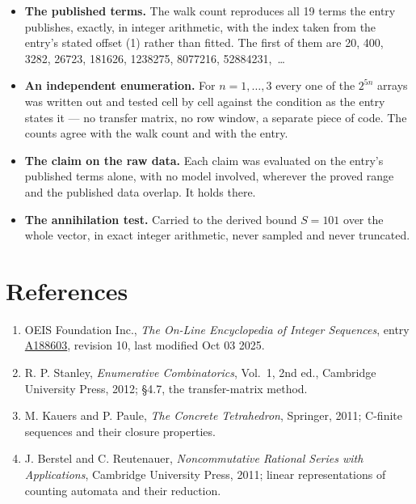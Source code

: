 \documentclass[11pt]{article}
\theoremstyle{definition}
\begin{document}
\begin{itemize}

\item {\bfseries The published terms.} The walk count reproduces all 19 terms the entry publishes, exactly, in integer arithmetic, with the index taken from the entry's stated offset (1) rather than fitted. The first of them are 20, 400, 3282, 26723, 181626, 1238275, 8077216, 52884231,~\dots

\item {\bfseries An independent enumeration.} For $n = 1,\dots,3$ every one of the $2^{5n}$ arrays was written out and tested cell by cell against the condition as the entry states it --- no transfer matrix, no row window, a separate piece of code. The counts agree with the walk count and with the entry.

\item {\bfseries The claim on the raw data.} Each claim was evaluated on the entry's published terms alone, with no model involved, wherever the proved range and the published data overlap. It holds there.

\item {\bfseries The annihilation test.} Carried to the derived bound $S = 101$ over the whole vector, in exact integer arithmetic, never sampled and never truncated.

\end{itemize}

\section{References}

\begin{enumerate}

\item OEIS Foundation Inc., \emph{The On-Line Encyclopedia of Integer Sequences}, entry \href{https://oeis.org/A188603}{A188603}, revision 10, last modified Oct 03 2025.

\item R. P. Stanley, \emph{Enumerative Combinatorics}, Vol.~1, 2nd ed., Cambridge University Press, 2012; \S4.7, the transfer-matrix method.

\item M. Kauers and P. Paule, \emph{The Concrete Tetrahedron}, Springer, 2011; C-finite sequences and their closure properties.

\item J. Berstel and C. Reutenauer, \emph{Noncommutative Rational Series with Applications}, Cambridge University Press, 2011; linear representations of counting automata and their reduction.

\end{enumerate}
\end{document}
